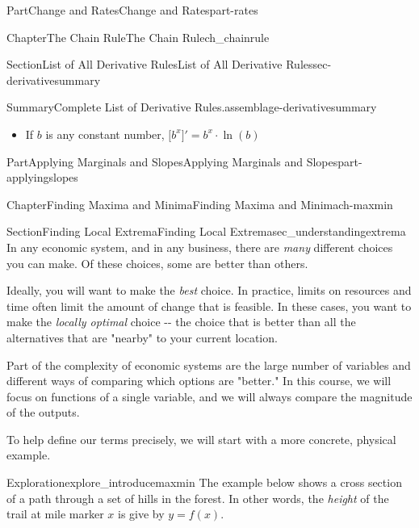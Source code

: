 \documentclass{tufte-book}
\numberwithin{equation}{chapter}
\newcommand{\D}[1]{ \Big[ #1 \Big]'  }
\begin{document}
\begin{partptx}{Part}{Change and Rates}{}{Change and Rates}{}{}{part-rates}
\begin{chapterptx}{Chapter}{The Chain Rule}{}{The Chain Rule}{}{}{ch_chainrule}
\begin{sectionptx}{Section}{List of All Derivative Rules}{}{List of All Derivative Rules}{}{}{sec-derivativesummary}
\begin{assemblage}{Summary}{Complete List of Derivative Rules.}{assemblage-derivativesummary}
\begin{itemize}[label=\textbullet]
\begin{itemize}[label=$\circ$]
\end{itemize}
%
\item{}If \(b\) is any constant number, \(\D{ b^x } = b^x\cdot \ln(b)\)%
\end{itemize}
%
\end{assemblage}
\end{sectionptx}
\end{chapterptx}
\end{partptx}
%
%
\typeout{************************************************}
\typeout{************************************************}
%
\begin{partptx}{Part}{Applying Marginals and Slopes}{}{Applying Marginals and Slopes}{}{}{part-applyingslopes}
\renewcommand*{\partname}{Part}
%
\typeout{************************************************}
\typeout{************************************************}
%
\begin{chapterptx}{Chapter}{Finding Maxima and Minima}{}{Finding Maxima and Minima}{}{}{ch-maxmin}
\renewcommand*{\chaptername}{Chapter}
%
%
\typeout{************************************************}
\typeout{************************************************}
%
\begin{sectionptx}{Section}{Finding Local Extrema}{}{Finding Local Extrema}{}{}{sec_understandingextrema}
In any economic system, and in any business, there are \emph{many} different choices you can make. Of these choices, some are better than others.%
\par
Ideally, you will want to make the \emph{best} choice. In practice, limits on resources and time often limit the amount of change that is feasible. In these cases, you want to make the \emph{locally optimal} choice -{}-{} the choice that is better than all the alternatives that are "nearby" to your current location.%
\par
Part of the complexity of economic systems are the  large number of variables and different ways of comparing which options are "better." In this course, we will focus on functions of a single variable, and we will always compare the magnitude of the outputs.%
\par
To help define our terms precisely, we will start with a more concrete, physical example.%
\begin{exploration}{Exploration}{}{explore_introducemaxmin}%
The example below shows a cross section of a path through a set of hills in the forest. In other words, the \emph{height} of the trail at mile marker \(x\) is give by \(y=f(x)\).%

\end{exploration}
\end{sectionptx}
\end{chapterptx}
\end{partptx}
\end{document}
